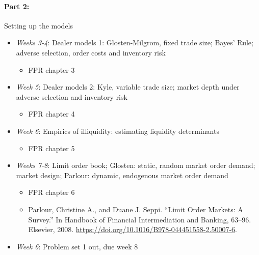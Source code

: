 \documentclass{article}
\begin{document}
\paragraph{Part 2:} Setting up the models
\begin{itemize}
	\item \textit{Weeks 3-4}: Dealer models 1: {Glosten-Milgrom}, fixed trade size; Bayes' Rule; adverse selection, order costs and inventory risk
	\begin{itemize}
		\item FPR chapter 3
	\end{itemize}
	\item \textit{Week 5}: Dealer models 2: {Kyle}, variable trade size; market depth under adverse selection and inventory risk
	\begin{itemize}
		\item FPR chapter 4
	\end{itemize}
	\item \textit{Week 6}: Empirics of illiquidity: estimating liquidity determinants
	\begin{itemize}
		\item FPR chapter 5
	\end{itemize}
	\item \textit{Weeks 7-8}: Limit order book; {Glosten}: static, random market order demand; market design; {Parlour}: dynamic, endogenous market order demand
	\begin{itemize}
		\item FPR chapter 6
		\item Parlour, Christine A., and Duane J. Seppi. “Limit Order Markets: A Survey.” In Handbook of Financial Intermediation and Banking, 63–96. Elsevier, 2008. \url{https://doi.org/10.1016/B978-044451558-2.50007-6}.
	\end{itemize}
	\item \textit{Week 6}: Problem set 1 out, due week 8
\end{itemize}

\medskip
\end{document}
